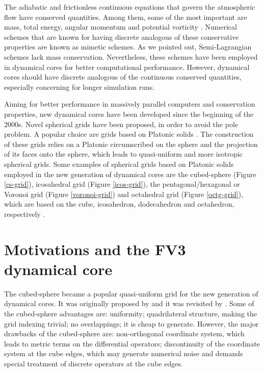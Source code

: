 The adiabatic and frictionless continuous equations that govern the atmospheric flow have 
conserved quantities. Among them, some of the most important are mass, total energy, 
angular momentum and potential vorticity \citep{thuburn:2011}.
Numerical schemes that are known for having discrete analogous of these conservative properties
are known as mimetic schemes.
As we pointed out, Semi-Lagrangian schemes lack mass conservation. Nevertheless, 
these schemes have been employed in dynamical cores for better computational performance.
However, dynamical cores should have discrete analogous of the 
continuous conserved quantities, especially concerning for longer simulation runs.

Aiming for better performance in massively parallel computers and conservation properties, 
new dynamical cores have been developed since the beginning of the 2000s.
Novel spherical grids have been proposed, in order to avoid the pole problem.
A popular choice are grids based on Platonic solids \citep{stan:2012}.
The construction of these grids relies on a Platonic circumscribed on the sphere and 
the projection of its faces onto the sphere, which leads to quasi-uniform and more isotropic
spherical grids.
Some examples of spherical grids based on Platonic solids employed in the new generation
of dynamical cores are the cubed-sphere (Figure \ref{cs-grid}), icosahedral grid (Figure \ref{icos-grid}), 
the pentagonal/hexagonal or Voronoi grid (Figure \ref{voronoi-grid}) and octahedral grid (Figure \ref{octg-grid}),
which are based on the cube, icosahedron, dodecahedron and octahedron, respectively \citep{ullrich:2017}.

\section{Motivations and the FV3 dynamical core}
The cubed-sphere became a popular quasi-uniform grid for the new generation of dynamical cores.
It was originally proposed by \citet{sadourny:1972} and it was revisited by \citet{ronchi:1996}.
Some of the cubed-sphere advantages are: uniformity; quadrilateral structure, 
making the grid indexing trivial; no overlappings; it is cheap to generate.
However, the major drawbacks of the cubed-sphere are: non-orthogonal coordinate system, which
leads to metric terms on the differential operators; discontinuity of the coordinate system
at the cube edges, which may generate numerical noise and
demands special treatment of discrete operators at the cube edges.

